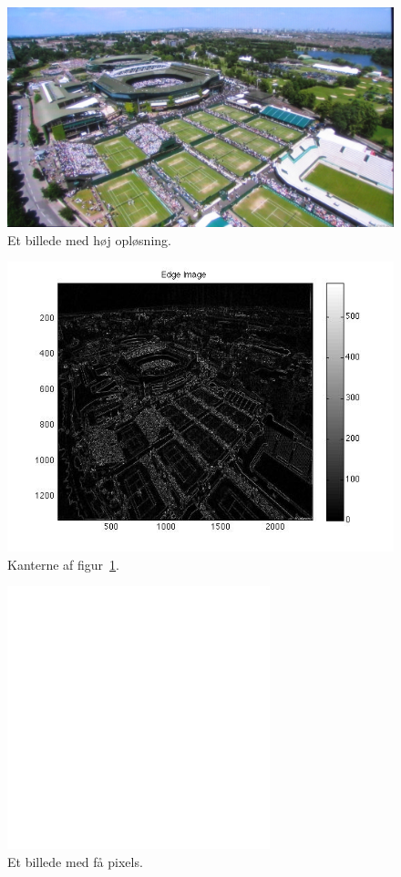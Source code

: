 \documentclass{article}
\begin{document}
	\begin{figure}
		\centering
		\includegraphics[width=4.5in]{test4.jpg}
		\caption{Et billede med høj opløsning.}
		\label{ke4}
	\end{figure}
	\begin{figure}
		\centering
		\includegraphics[width=6in]{test4_result.jpg}
		\caption{Kanterne af figur~\ref{ke4}.}
		\label{ke4r}
	\end{figure}
	\begin{figure}
		\centering
		\includegraphics[width=3in]{test5.jpg}
		\caption{Et billede med få pixels.}
		\label{ke5}
	\end{figure}
\end{document}
